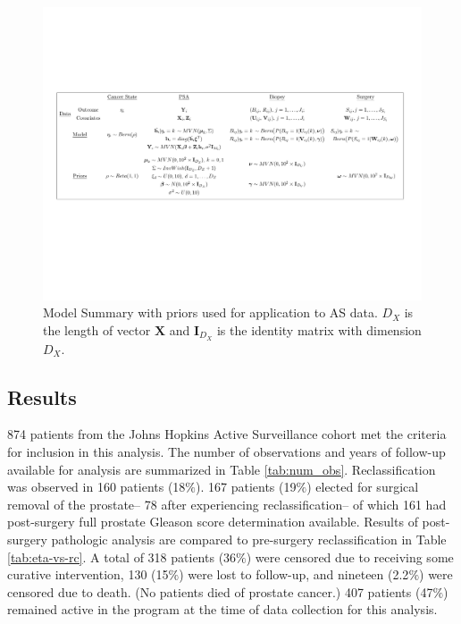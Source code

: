\documentclass[12pt, letterpaper]{article}
\newcommand{\bmX}{\mathbf{X}}
\newcommand{\bmI}{\mathbf{I}}
\begin{document}
\begin{figure}
\begin{center}
\includegraphics[width=\textwidth]{model-summary-table.pdf}
\caption{Model Summary with priors used for application to AS data. $D_X$ is the length of vector $\bmX$ and $\bmI_{D_X}$ is the identity matrix with dimension $D_X$.}
\label{fig:model-summary}
\end{center}
\end{figure}



\subsection{Results}
874 patients from the Johns Hopkins Active Surveillance cohort met the criteria for inclusion in this analysis. The number of observations and years of follow-up available for analysis are summarized in Table \ref{tab:num_obs}. Reclassification was observed in 160 patients (18$\%$). 167 patients (19$\%$) elected for surgical removal of the prostate-- 78 after experiencing reclassification-- of which 161 had post-surgery full prostate Gleason score determination available. Results of post-surgery pathologic analysis are compared to pre-surgery reclassification in Table \ref{tab:eta-vs-rc}. A total of 318 patients (36$\%$) were censored due to receiving some curative intervention, 130 (15$\%$) were lost to follow-up, and nineteen (2.2$\%$) were censored due to death. (No patients died of prostate cancer.) 407 patients (47$\%$) remained active in the program at the time of data collection for this analysis. 
\end{document}
